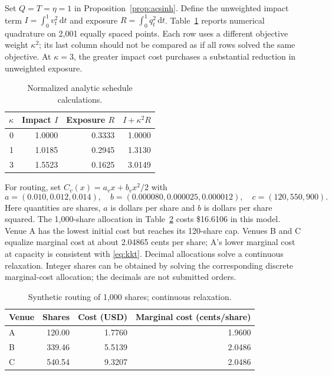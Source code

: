\documentclass[11pt]{article}
\numberwithin{equation}{section}
\theoremstyle{definition}
\theoremstyle{remark}
\theoremstyle{definition}
\newcommand{\dd}{\,\mathrm d}
\begin{document}
Set $Q=T=\eta=1$ in Proposition~\ref{prop:acsinh}. Define the unweighted impact
term $I=\int_0^1v_t^2\dd t$ and exposure $R=\int_0^1q_t^2\dd t$.
Table~\ref{tab:schedules} reports numerical quadrature on 2,001 equally spaced
points. Each row uses a different objective weight $\kappa^2$; its last
column should not be compared as if all rows solved the same objective.
At $\kappa=3$, the greater impact cost purchases a substantial reduction in
unweighted exposure.

\begin{table}[tb]
\centering
\caption{Normalized analytic schedule calculations.}
\label{tab:schedules}
\begin{tabular}{rrrr}
\toprule $\kappa$ & Impact $I$ & Exposure $R$ & $I+\kappa^2R$ \\\midrule
0 & 1.0000 & 0.3333 & 1.0000 \\
1 & 1.0185 & 0.2945 & 1.3130 \\
3 & 1.5523 & 0.1625 & 3.0149 \\

\bottomrule
\end{tabular}
\end{table}

For routing, set $C_v(x)=a_vx+b_vx^2/2$ with
\begin{equation}\label{eq:routeparams}
 a=(0.010,0.012,0.014),\quad
 b=(0.000080,0.000025,0.000012),\quad
 c=(120,550,900).
\end{equation}
Here quantities are shares, $a$ is dollars per share and $b$ is dollars per
share squared. The 1,000-share allocation in Table~\ref{tab:routing} costs
\$16.6106 in this model. Venue A has the lowest initial cost but reaches its
120-share cap. Venues B and C equalize marginal cost at about 2.04865 cents
per share; A's lower marginal cost at capacity is consistent with
\eqref{eq:kkt}. Decimal allocations solve a continuous relaxation. Integer
shares can be obtained by solving the corresponding discrete marginal-cost
allocation; the decimals are not submitted orders.

\begin{table}[tb]
\centering
\caption{Synthetic routing of 1,000 shares; continuous relaxation.}
\label{tab:routing}
\begin{tabular}{lrrr}
\toprule Venue & Shares & Cost (USD) & Marginal cost (cents/share) \\\midrule
A & 120.00 & 1.7760 & 1.9600 \\
B & 339.46 & 5.5139 & 2.0486 \\
C & 540.54 & 9.3207 & 2.0486 \\

\bottomrule
\end{tabular}
\end{table}
\end{document}
